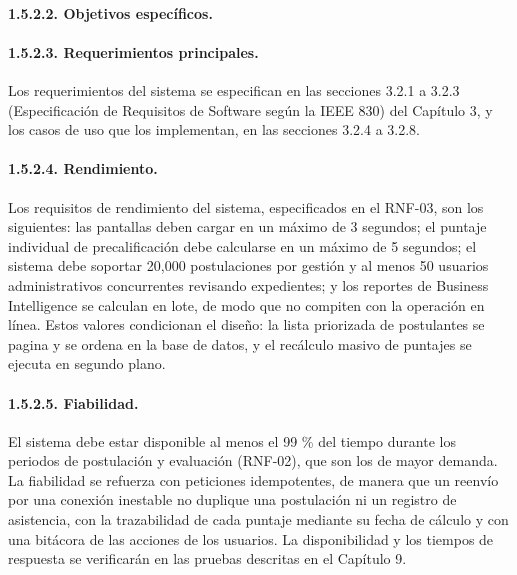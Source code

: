 

\paragraph{1.5.2.2. Objetivos específicos.}



\paragraph{1.5.2.3. Requerimientos principales.}

Los requerimientos del sistema se especifican en las secciones 3.2.1 a 3.2.3 (Especificación de Requisitos de Software según la IEEE 830) del Capítulo 3, y los casos de uso que los implementan, en las secciones 3.2.4 a 3.2.8.

\paragraph{1.5.2.4. Rendimiento.}

Los requisitos de rendimiento del sistema, especificados en el RNF-03, son los siguientes: las pantallas deben cargar en un máximo de 3 segundos; el puntaje individual de precalificación debe calcularse en un máximo de 5 segundos; el sistema debe soportar 20,000 postulaciones por gestión y al menos 50 usuarios administrativos concurrentes revisando expedientes; y los reportes de Business Intelligence se calculan en lote, de modo que no compiten con la operación en línea. Estos valores condicionan el diseño: la lista priorizada de postulantes se pagina y se ordena en la base de datos, y el recálculo masivo de puntajes se ejecuta en segundo plano.

\paragraph{1.5.2.5. Fiabilidad.}

El sistema debe estar disponible al menos el 99 \% del tiempo durante los periodos de postulación y evaluación (RNF-02), que son los de mayor demanda. La fiabilidad se refuerza con peticiones idempotentes, de manera que un reenvío por una conexión inestable no duplique una postulación ni un registro de asistencia, con la trazabilidad de cada puntaje mediante su fecha de cálculo y con una bitácora de las acciones de los usuarios. La disponibilidad y los tiempos de respuesta se verificarán en las pruebas descritas en el Capítulo 9.

